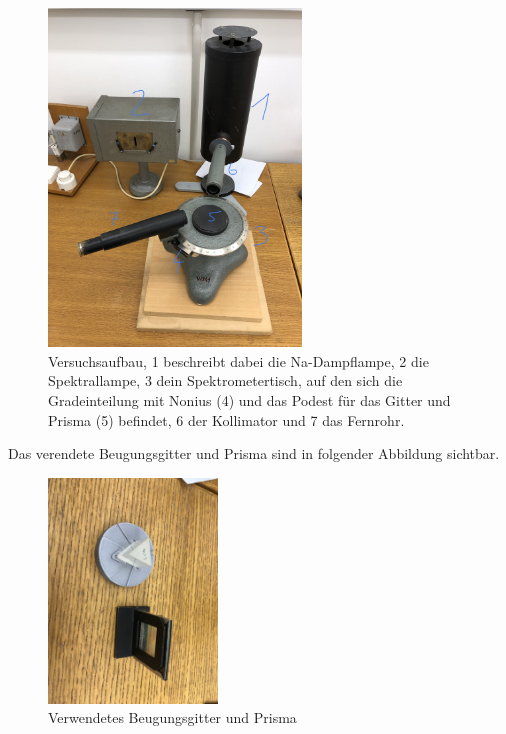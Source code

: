\documentclass[11pt,ngerman]{scrartcl}
\begin{document}
\begin{figure}[H]
	\begin{center}
		\includegraphics[width=0.6\textwidth]{aufbau_eig}
	\end{center}
	\caption{Versuchsaufbau, 1 beschreibt dabei die Na-Dampflampe, 2 die Spektrallampe, 3 dein Spektrometertisch, auf den sich die Gradeinteilung mit Nonius (4) und das Podest für das Gitter und Prisma (5) befindet, 6 der Kollimator und 7 das Fernrohr.}
	\label{fig:aufbau}
\end{figure}

Das verendete Beugungsgitter und Prisma sind in folgender Abbildung sichtbar.

\begin{figure}[H]
	\begin{center}
		\includegraphics[width=0.4\textwidth]{prisma}
	\end{center}
	\caption{Verwendetes Beugungsgitter und Prisma}
	\label{fig:prisma}
\end{figure}
\end{document}
